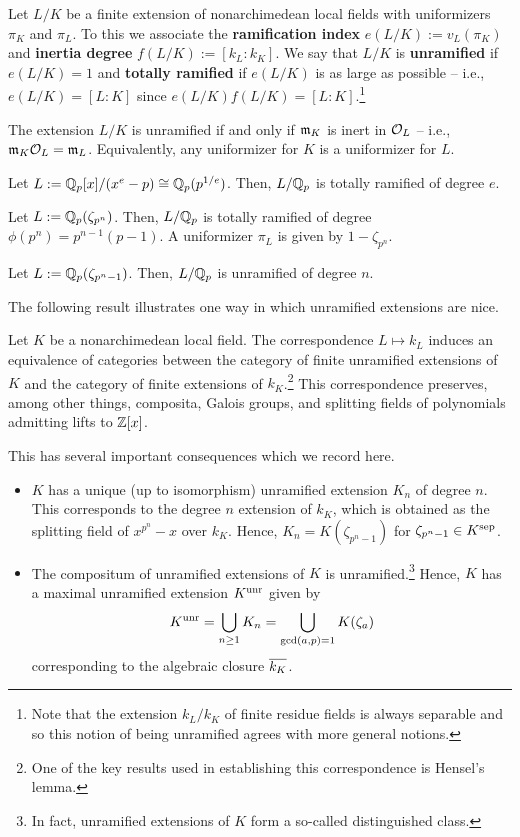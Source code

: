 \documentclass[11pt]{article}
\begin{document}
\begin{definition}
Let $L/K$ be a finite extension of nonarchimedean local fields with uniformizers $\pi_K$ and $\pi_L$. To this we associate the \textbf{ramification index} $e(L/K):=v_L(\pi_K)$ and \textbf{inertia degree} $f(L/K):=[k_L:k_K]$. We say that $L/K$ is \textbf{unramified} if $e(L/K)=1$ and \textbf{totally ramified} if $e(L/K)$ is as large as possible -- i.e., $e(L/K)=[L:K]$ since $e(L/K)f(L/K)=[L:K]$.\footnote{Note that the extension $k_L/k_K$ of finite residue fields is always separable and so this notion of being unramified agrees with more general notions.}
\end{definition}

The extension $L/K$ is unramified if and only if $\mathfrak{m}_K$ is inert in $\mathcal{O}_L$ -- i.e., $\mathfrak{m}_K\mathcal{O}_L=\mathfrak{m}_L$. Equivalently, any uniformizer for $K$ is a uniformizer for $L$.

\begin{example}
\hfill
\begin{enum}{\arabic}
\item Let $L:=\mathbb{Q}_p[x]/(x^e-p)\cong\mathbb{Q}_p(p^{1/e})$. Then, $L/\mathbb{Q}_p$ is totally ramified of degree $e$.

\item Let $L:=\mathbb{Q}_p(\zeta_{p^n})$. Then, $L/\mathbb{Q}_p$ is totally ramified of degree $\phi(p^n)=p^{n-1}(p-1)$. A uniformizer $\pi_L$ is given by $1-\zeta_{p^n}$.

\item Let $L:=\mathbb{Q}_p(\zeta_{p^n-1})$. Then, $L/\mathbb{Q}_p$ is unramified of degree $n$.
\end{enum}
\end{example}

The following result illustrates one way in which unramified extensions are nice.

\begin{theorem}
Let $K$ be a nonarchimedean local field. The correspondence $L\mapsto k_L$ induces an equivalence of categories between the category of finite unramified extensions of $K$ and the category of finite extensions of $k_K$.\footnote{One of the key results used in establishing this correspondence is Hensel's lemma.} This correspondence preserves, among other things, composita, Galois groups, and splitting fields of polynomials admitting lifts to $\mathbb{Z}[x]$.
\end{theorem}

This has several important consequences which we record here.
\begin{itemize}
\item $K$ has a unique (up to isomorphism) unramified extension $K_n$ of degree $n$. This corresponds to the degree $n$ extension of $k_K$, which is obtained as the splitting field of $x^{p^n}-x$ over $k_K$. Hence, $K_n=K(\zeta_{p^n-1})$ for $\zeta_{p^n-1}\in K^{\operatorname{sep}}$.

\item The compositum of unramified extensions of $K$ is unramified.\footnote{In fact, unramified extensions of $K$ form a so-called distinguished class.} Hence, $K$ has a maximal unramified extension $K^{\operatorname{unr}}$ given by
$$K^{\operatorname{unr}}=\bigcup_{n\geq1}K_n=\bigcup_{\gcd(a,p)=1}K(\zeta_a)$$
corresponding to the algebraic closure $\overline{k_K}$.
\end{itemize}
\end{document}

